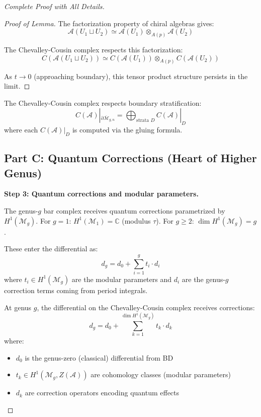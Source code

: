 \begin{proof}[Complete Proof with All Details]
\begin{proof}[Proof of Lemma]
The factorization property of chiral algebras gives:
$$\mathcal{A}(U_1 \sqcup U_2) \simeq \mathcal{A}(U_1) \otimes_{A(p)} \mathcal{A}(U_2)$$

The Chevalley-Cousin complex respects this factorization:
$$C(\mathcal{A}(U_1 \sqcup U_2)) \simeq C(\mathcal{A}(U_1)) \otimes_{A(p)} C(\mathcal{A}(U_2))$$

As $t \to 0$ (approaching boundary), this tensor product structure persists in the limit.
\end{proof}

\begin{corollary}\label{cor:CC-at-boundary}
The Chevalley-Cousin complex respects boundary stratification:
$$C(\mathcal{A})|_{\partial \overline{\mathcal{M}}_{g,n}} = \bigoplus_{\text{strata } D} C(\mathcal{A})|_D$$
where each $C(\mathcal{A})|_D$ is computed via the gluing formula.
\end{corollary}

\subsection*{Part C: Quantum Corrections (Heart of Higher Genus)}

\textbf{Step 3: Quantum corrections and modular parameters.}

The genus-$g$ bar complex receives quantum corrections parametrized by 
$H^1(\mathcal{M}_g)$. For $g=1$: $H^1(\mathcal{M}_1) = \mathbb{C}$ (modulus $\tau$). 
For $g \geq 2$: $\dim H^1(\mathcal{M}_g) = g$.

These enter the differential as:
$$d_g = d_0 + \sum_{i=1}^g t_i \cdot d_i$$
where $t_i \in H^1(\mathcal{M}_g)$ are the modular parameters and $d_i$ are the 
genus-$g$ correction terms coming from period integrals.

\begin{definition}\label{def:quantum-differential}
At genus $g$, the differential on the Chevalley-Cousin complex receives corrections:
$$d_g = d_0 + \sum_{k=1}^{\dim H^1(\mathcal{M}_g)} t_k \cdot d_k$$
where:
\begin{itemize}
\item $d_0$ is the genus-zero (classical) differential from BD
\item $t_k \in H^1(\mathcal{M}_g, Z(\mathcal{A}))$ are cohomology classes (modular parameters)
\item $d_k$ are correction operators encoding quantum effects
\end{itemize}


\end{definition}
\end{proof}

